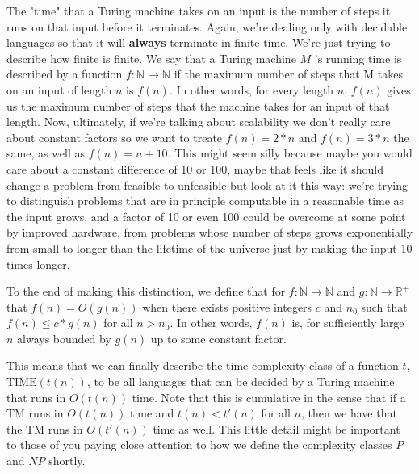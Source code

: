 \documentclass[11pt]{article}
\begin{document}
The "time" that a Turing machine takes on an input is the number of steps it runs on that input before it terminates. Again, we're dealing only with decidable languages so that it will \textbf{always} terminate in finite time. We're just trying to describe how finite is finite.  We say that a Turing machine $M$ 's running time is described by a function $f : \mathbb{N} \to \mathbb{N}$ if the maximum number of steps that M takes on an input of length $n$ is $f(n)$. In other words, for every length $n$, $f(n)$ gives us the maximum number of steps that the machine takes for an input of that length. Now, ultimately, if we're talking about scalability we don't really care about constant factors so we want to treate $f(n) = 2*n$ and $f(n) = 3*n$ the same, as well as $f(n) = n + 10$. This might seem silly because maybe you would care about a constant difference of 10 or 100, maybe that feels like it should change a problem from feasible to unfeasible but look at it this way: we're trying to distinguish problems that are in principle computable in a reasonable time as the input grows, and a factor of 10 or even 100 could be overcome at some point by improved hardware, from problems whose number of steps grows exponentially from small to longer-than-the-lifetime-of-the-universe just by making the input 10 times longer.

To the end of making this distinction, we define that for $f : \mathbb{N} \to \mathbb{N}$ and $g : \mathbb{N} \to \mathbb{R}^+$ that $f(n) = O(g(n))$ when there exists positive integers $c$ and $n_0$ such that $f(n) \le c*g(n)$ for all $n > n_0$. In other words, $f(n)$ is, for sufficiently large $n$ always bounded by $g(n)$ up to some constant factor. 

This means that we can finally describe the time complexity class of a function $t$, $\text{TIME}(t(n))$, to be all languages that can be decided by a Turing machine that runs in $O(t(n))$ time. Note that this is cumulative in the sense that if a TM runs in $O(t(n))$ time and $t(n) < t'(n)$ for all $n$, then we have that the TM runs in $O(t'(n))$ time as well. This little detail might be important to those of you paying close attention to how we define the complexity classes $P$ and $NP$ shortly.
\end{document}
